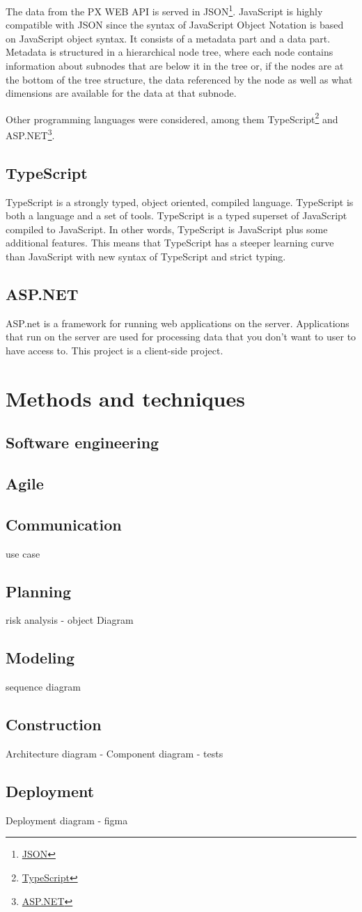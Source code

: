 The data from the PX WEB API is served in JSON\footnote{\href{https://json.org/}{JSON}\label{json}}. JavaScript is highly compatible with JSON since the syntax of JavaScript Object Notation is based on JavaScript object syntax. It  consists of a metadata part and a data part. Metadata is structured in a hierarchical node tree, where each node contains information about subnodes that are below it in the tree or, if the nodes are at the bottom of the tree structure, the data referenced by the node as well as what dimensions are available for the data at that subnode.

Other programming languages were considered, among them TypeScript\footnote{\href{https://www.typescriptlang.org/}{TypeScript}\label{typescript}} and ASP.NET\footnote{\href{https://dotnet.microsoft.com/apps/aspnet}{ASP.NET}\label{asp.net}}.

\subsection{TypeScript}

TypeScript is a strongly typed, object oriented, compiled language. TypeScript is both a language and a set of tools. TypeScript is a typed superset of JavaScript compiled to JavaScript. In other words, TypeScript is JavaScript plus some additional features. This means that TypeScript has a steeper learning curve than JavaScript with new syntax of TypeScript and strict typing.

\subsection{ASP.NET}

ASP.net is a framework for running web applications on the server. Applications that run on the server are used for processing data that you don't want to user to have access to. This project is a client-side project.


\section{Methods and techniques}
\subsection{Software engineering}
\subsection{Agile}
\subsection{Communication}
use case
\subsection{Planning}
risk analysis - object Diagram
\subsection{Modeling}
sequence diagram
\subsection{Construction}
Architecture diagram - Component diagram - tests
\subsection{Deployment}
Deployment diagram - figma

